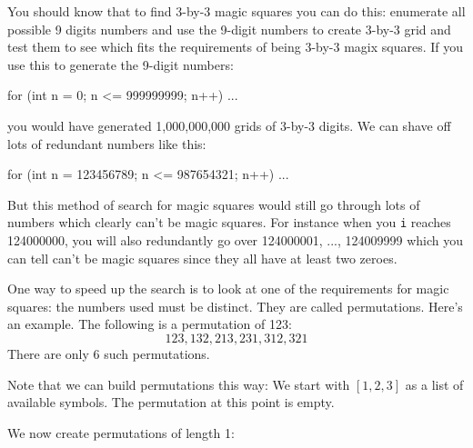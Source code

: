 You should know that to find 3-by-3 magic squares you can do this:
enumerate all possible 9 digits numbers and use the 9-digit numbers to 
create 3-by-3 grid and test them to see which 
fits the requirements of being 3-by-3 magix squares.
If you use this to generate the 9-digit numbers:
\begin{console}
for (int n = 0; n <= 999999999; n++)
{
   ...
}
\end{console}
you would have generated 1,000,000,000 grids of 3-by-3 digits.
We can shave off lots of redundant numbers like this:
\begin{console}
for (int n = 123456789; n <= 987654321; n++)
{
   ...
}
\end{console}
But this method of search for magic squares would still go through
lots of numbers which clearly can't be magic squares.
For instance when you \verb!i! reaches
124000000, you will also redundantly go over 124000001, ..., 124009999
which you can tell can't be magic squares since they all have at least two 
zeroes.

One way to speed up the search is to look at one of the requirements for
magic squares: the numbers used must be distinct.
They are called permutations.
Here's an example. 
The following is a permutation of 123:
\[
123, 132, 213, 231, 312, 321
\]
There are only 6 such permutations.

Note that we can build permutations this way:
We start with $[1,2,3]$ as a list of available symbols.
The permutation at this point is empty.
We now create permutations of length 1:

